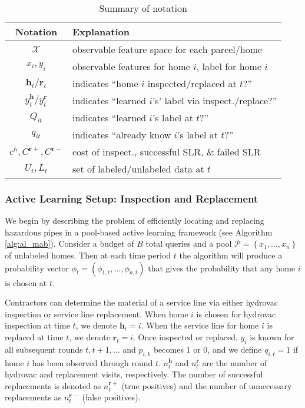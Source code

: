 \documentclass[sigconf]{acmart}
\newcommand{\inspect}{\mathbf{h}}
\newcommand{\replace}{\mathbf{r}}
\newcommand{\pool}{\mathcal{P}}
\begin{document}
\begin{table}
	\caption{Summary of notation }\label{tbl:notation}

	\begin{tabular}{cl}
	\hline
	Notation & Explanation \\
	\hline
	$\mathcal{X}$ & observable feature space for each parcel/home \\
  $x_i, y_i$ & observable features for home $i$, label for home $i$ \\
	$\inspect_t/\replace_t$ & indicates ``home $i$ inspected/replaced at $t$?''\\
	$y_t^\inspect/ y_t^\replace$ & indicates ``learned $i$'s' label via inspect./replace?''\\
	$Q_{it}$ & indicates ``learned $i$'s label at $t$?''\\
	$q_{it}$ & indicates ``already know $i$'s label at $t$?''\\
	$c^h, C^{\replace+}, C^{\replace-}$ & cost of inspect., successful SLR, \& failed SLR \\
	$U_t, L_t$ & set of labeled/unlabeled data at $t$\\
	\hline
	\end{tabular}
\end{table}


\subsubsection{Active Learning Setup: Inspection and Replacement}


We begin by describing the problem of efficiently locating and replacing hazardous pipes in a pool-based active learning framework (see Algorithm \ref{alg:al_mab}). Consider a budget of $B$ total queries and a pool $\pool = \left \{ x_1,\ldots,x_n \right \}$ of unlabeled homes.  Then at each time period $t$ the algorithm will produce a probability vector $\phi_t = (\phi_{1,t},\ldots,\phi_{n,t})$ that gives the probability that any home $i$ is chosen at $t$.


Contractors can determine the material of a service line via either hydrovac inspection or service line replacement. When home $i$ is chosen for hydrovac inspection at time $t$, we denote $\inspect_t = i$.  When the service line for home $i$ is replaced at time $t$, we denote $\replace_t = i$.  Once inspected or replaced, $y_i$ is known for all subsequent rounds $t, t+1, \ldots $ and $p_{i,k}$ becomes 1 or 0, and we define $q_{i,t}=1$ if home $i$ has been observed through round $t$. $n_t^{\inspect}$ and $n_t^{\replace}$ are the number of hydrovac and replacement visits, respectively. The number of successful replacements is denoted as $n_t^{\replace+}$ (true positives) and the number of unnecessary replacements as $n_t^{\replace-}$ (false positives). 
\end{document}
